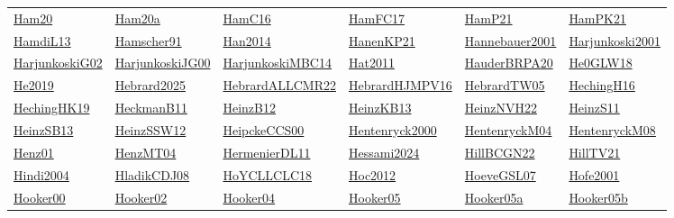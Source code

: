 \begin{longtable}{*{6}{l}}
\hyperref[detail:Ham20]{Ham20} & \hyperref[detail:Ham20a]{Ham20a} & \hyperref[detail:HamC16]{HamC16} & \hyperref[detail:HamFC17]{HamFC17} & \hyperref[detail:HamP21]{HamP21} & \hyperref[detail:HamPK21]{HamPK21}\\ 
\hyperref[detail:HamdiL13]{HamdiL13} & \hyperref[detail:Hamscher91]{Hamscher91} & \hyperref[detail:Han2014]{Han2014} & \hyperref[detail:HanenKP21]{HanenKP21} & \hyperref[detail:Hannebauer2001]{Hannebauer2001} & \hyperref[detail:Harjunkoski2001]{Harjunkoski2001}\\ 
\hyperref[detail:HarjunkoskiG02]{HarjunkoskiG02} & \hyperref[detail:HarjunkoskiJG00]{HarjunkoskiJG00} & \hyperref[detail:HarjunkoskiMBC14]{HarjunkoskiMBC14} & \hyperref[detail:Hat2011]{Hat2011} & \hyperref[detail:HauderBRPA20]{HauderBRPA20} & \hyperref[detail:He0GLW18]{He0GLW18}\\ 
\hyperref[detail:He2019]{He2019} & \hyperref[detail:Hebrard2025]{Hebrard2025} & \hyperref[detail:HebrardALLCMR22]{HebrardALLCMR22} & \hyperref[detail:HebrardHJMPV16]{HebrardHJMPV16} & \hyperref[detail:HebrardTW05]{HebrardTW05} & \hyperref[detail:HechingH16]{HechingH16}\\ 
\hyperref[detail:HechingHK19]{HechingHK19} & \hyperref[detail:HeckmanB11]{HeckmanB11} & \hyperref[detail:HeinzB12]{HeinzB12} & \hyperref[detail:HeinzKB13]{HeinzKB13} & \hyperref[detail:HeinzNVH22]{HeinzNVH22} & \hyperref[detail:HeinzS11]{HeinzS11}\\ 
\hyperref[detail:HeinzSB13]{HeinzSB13} & \hyperref[detail:HeinzSSW12]{HeinzSSW12} & \hyperref[detail:HeipckeCCS00]{HeipckeCCS00} & \hyperref[detail:Hentenryck2000]{Hentenryck2000} & \hyperref[detail:HentenryckM04]{HentenryckM04} & \hyperref[detail:HentenryckM08]{HentenryckM08}\\ 
\hyperref[detail:Henz01]{Henz01} & \hyperref[detail:HenzMT04]{HenzMT04} & \hyperref[detail:HermenierDL11]{HermenierDL11} & \hyperref[detail:Hessami2024]{Hessami2024} & \hyperref[detail:HillBCGN22]{HillBCGN22} & \hyperref[detail:HillTV21]{HillTV21}\\ 
\hyperref[detail:Hindi2004]{Hindi2004} & \hyperref[detail:HladikCDJ08]{HladikCDJ08} & \hyperref[detail:HoYCLLCLC18]{HoYCLLCLC18} & \hyperref[detail:Hoc2012]{Hoc2012} & \hyperref[detail:HoeveGSL07]{HoeveGSL07} & \hyperref[detail:Hofe2001]{Hofe2001}\\ 
\hyperref[detail:Hooker00]{Hooker00} & \hyperref[detail:Hooker02]{Hooker02} & \hyperref[detail:Hooker04]{Hooker04} & \hyperref[detail:Hooker05]{Hooker05} & \hyperref[detail:Hooker05a]{Hooker05a} & \hyperref[detail:Hooker05b]{Hooker05b}\\ 

\end{longtable}
